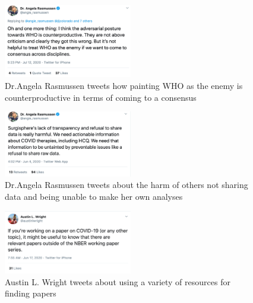 \documentclass[acmsmall,authordraft]{acmart}
\begin{document}
\begin{figure}
  \includegraphics[width=0.5\textwidth]{Pictures/Appendix_Tweets/angela rasmussen tweet3.png}
  \caption{Dr.Angela Rasmussen tweets how painting WHO as the enemy is counterproductive in terms of coming to a consensus}
  \label{angela_rasmussen_tweet3}
\end{figure}

\begin{figure}
  \includegraphics[width=0.5\textwidth]{Pictures/Appendix_Tweets/angela rasmussen tweet4.png}
  \caption{Dr.Angela Rasmussen tweets about the harm of others not sharing data and being unable to make her own analyses}
  \label{angela_rasmussen_tweet4}
\end{figure}

\begin{figure}
  \includegraphics[width=0.5\textwidth]{Pictures/Appendix_Tweets/austin wright tweet.png}
  \caption{Austin L. Wright tweets about using a variety of resources for finding papers}
  \label{austin_wright_tweet}
\end{figure}
\end{document}
